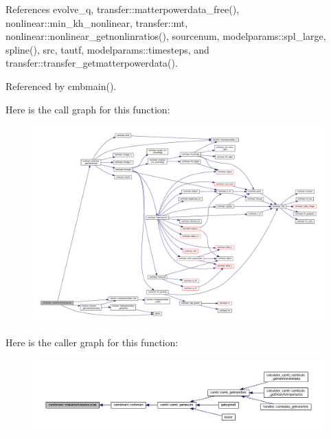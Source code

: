References evolve\+\_\+q, transfer\+::matterpowerdata\+\_\+free(), nonlinear\+::min\+\_\+kh\+\_\+nonlinear, transfer\+::mt, nonlinear\+::nonlinear\+\_\+getnonlinratios(), sourcenum, modelparams\+::spl\+\_\+large, spline(), src, tautf, modelparams\+::timesteps, and transfer\+::transfer\+\_\+getmatterpowerdata().



Referenced by cmbmain().

Here is the call graph for this function\+:
\nopagebreak
\begin{figure}[H]
\begin{center}
\leavevmode
\includegraphics[width=350pt]{namespacecambmain_a5b302c437be8bf6d127dc65f638778c8_cgraph}
\end{center}
\end{figure}
Here is the caller graph for this function\+:
\nopagebreak
\begin{figure}[H]
\begin{center}
\leavevmode
\includegraphics[width=350pt]{namespacecambmain_a5b302c437be8bf6d127dc65f638778c8_icgraph}
\end{center}
\end{figure}
\mbox{\label{namespacecambmain_a96c41c9fdee3e69fba450a460df25472}} 

